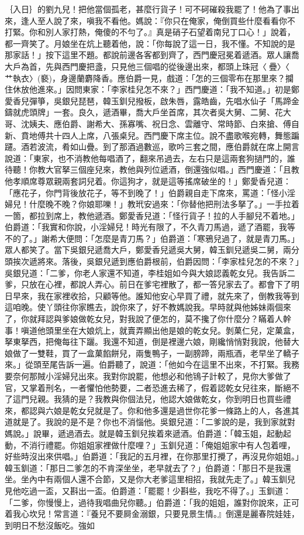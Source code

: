 \begin{showcontents}{}
｛入日｝的劉九兒！把他當個孤老，甚麼行貨子！可不砢磪殺我罷了！他為了事出來，逢人至人說了來，嗔我不看他。媽說：『你只在俺家，俺倒買些什麼看看你不打緊。你和別人家打熱，俺傻的不勻了。』真是硝子石望着南兒丁口心！」說着，都一齊笑了。月娘坐在炕上聽着他，說：「你每說了這一日，我不懂。不知說的是那家話！」按下這里不題。都說前邊各客都到齊了，西門慶冠冕着遞酒。眾人讓喬大戶為首，先與西門慶把盞，只見他三個唱的從後邊出來，都頭上珠冠〈疊〉〈艹執衣〉(褻)，身邊蘭麝降香。應伯爵一見，戲道：「怎的三個零布在那里來？攔住休放他進來。」因問東家：「李家桂兒怎不來？」西門慶道：「我不知道。」初是鄭愛香兒彈箏，吳銀兒琵琶，韓玉釧兒撥板，啟朱唇，露皓齒，先唱水仙子「馬蹄金鑄就虎頭牌」一套。良久，遞酒畢，喬大戶坐首席，其次者吳大舅、二舅、花大哥、沈姨夫、應伯爵、謝希大、孫寡嘴、祝日念、雲離守、常時節、白來搶、傅自新、賁地傅共十四人上席，八張桌兒。西門慶下席主位。說不盡歌喉宛轉，舞態蹁躚。酒若波流，肴如山疊。到了那酒過數巡，歌吟三套之間，應伯爵就在席上開言說道：「東家，也不消教他每唱酒了，翻來吊過去，左右只是這兩套狗撾門的，誰待聽！你教大官拏三個座兒來，教他與列位遞酒，倒還強似唱。」西門慶道：「且教他孝順席尊眾親兩套詞兒着。你這狗才，就是這等搖席破坐的！」鄭愛香兒道：「應花子，你門背後放花子，等不到晚了！」伯爵親自走下席來，罵道：「怪小淫婦兒！什麼晚不晚？你娘耶嚛！」教玳安過來：「你替他把刑法多拏了。」一手拉着一箇，都拉到席上，教他遞酒。鄭愛香兒道：「怪行貨子！拉的人手腳兒不着地。」伯爵道：「我實和你說，小淫婦兒！時光有限了，不久青刀馬過，遞了酒罷，我等不的了。」謝希大便問：「怎麼是青刀馬？」伯爵道：「寒鴉兒過了，就是青刀馬。」眾人都笑了。當下吳銀兒遞喬大戶，鄭愛香兒遞吳大舅，韓玉釧兒遞吳二舅，兩分頭挨次遞將來。落後，吳銀兒遞到應伯爵根前，伯爵因問：「李家桂兒怎的不來？」吳銀兒道：「二爹，你老人家還不知道，李桂姐如今與大娘認義乾女兒。我告訴二爹，只放在心裡，都說人弄心。前日在爹宅裡散了，都一答兒家去了。都會下了明日早來，我在家裡收拾，只顧等他。誰知他安心早買了禮，就先來了，倒教我等到這咱晚。使丫頭往你家瞧去，說你來了，好不教媽說我。早時就與他姊妹兩個來了，你就拜認與爹娘做乾女兒，對我說了便怎的，莫不攙了你什麼分？瞞着人幹事！嗔道他頭里坐在大娘炕上，就賣弄顯出他是娘的乾女兒。剝菓仁兒，定菓盒，拏東拏西，把俺每往下躧。我還不知道，倒是裡邊六娘，剛纔悄悄對我說，他替大娘做了一雙鞋，買了一盒菓餡餅兒，兩隻鴨子，一副膀蹄，兩瓶酒，老早坐了轎子來。」從頭至尾告訴一遍。伯爵聽了，說道：「他如今在這里不出來，不打緊。我務要奈何那賊小淫婦兒出來。我對你說罷，他想必和他鴇子計較了，見你大爹做了官，又掌着刑名，一者懼怕他勢要，二者恐進去稀了，假着認乾女兒往來，斷絕不了這門兒親。我猜的是？我教與你個法兒，他認大娘做乾女，你到明日也買些禮來，都認與六娘是乾女兒就是了。你和他多還是過世你花爹一條路上的人，各進其道就是了。我說的是不是？你也不消惱他。吳銀兒道：「二爹說的是，我到家就對媽說。」說畢，遞過酒去。就是韓玉釧兒挨着來遞酒。伯爵道：「韓玉姐，起動起動，不消行禮罷。你姐姐家裡做什麼哩？」玉釧兒道：「俺姐姐家中有人包着哩，好些時沒出來供唱。」伯爵道：「我記的五月裡，在你那里打攪了，再沒見你姐姐。」韓玉釧道：「那日二爹怎的不肯深坐坐，老早就去了？」伯爵道：「那日不是我還坐。坐內中有兩個人還不合節，又是你大老爹這里相招，我就先走了。」韓玉釧兒見他吃過一盃，又斟出一盃。伯爵道：「罷罷！少斟些，我吃不得了。」玉釧道：「二爹，你慢慢上，過待我唱曲兒你聽。」伯爵道：「我的姐姐，誰對你說來，正可着我心坎兒！常言道：『養兒不要屙金溺銀，只要見景生情。』倒還是麗春院娃娃，到明日不愁沒飯吃。強如
\end{showcontents}
